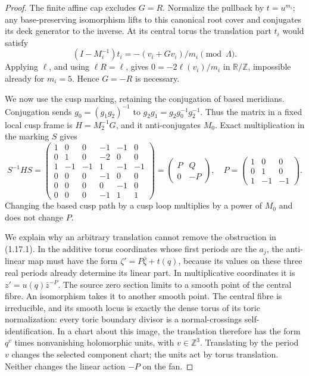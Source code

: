 \begin{proof}
The finite affine cap excludes $G=R$.  Normalize the pullback by
$t=u^{m_i}$; any base-preserving isomorphism lifts to this canonical
root cover and conjugates its deck generator to the inverse.
At its central torus the translation part $t_i$ would satisfy
\[
(I-M_i^{-1})t_i=-(v_i+Gv_i)/m_i\pmod\Lambda.
\]
Applying $\ell$, and using $\ell R=\ell$, gives
$0=-2\ell(v_i)/m_i$ in $\mathbb R/\mathbb Z$, impossible already
for $m_i=5$.  Hence $G=-R$ is necessary.

We now use the cusp marking, retaining the conjugation of based
meridians.  Conjugation sends
$g_0=(g_1g_2)^{-1}$ to $g_2g_1=g_2g_0^{-1}g_2^{-1}$.
Thus the matrix in a fixed local cusp frame is
$H=M_2^{-1}G$, and it anti-conjugates $M_0$.
Exact multiplication in the marking $S$ gives
\[
S^{-1}HS=
\begin{pmatrix}
1&0&0&-1&-1&0\\
0&1&0&-2&0&0\\
1&-1&-1&1&-1&-1\\
0&0&0&-1&0&0\\
0&0&0&0&-1&0\\
0&0&0&-1&1&1
\end{pmatrix}
=\begin{pmatrix}P&Q\\0&-P\end{pmatrix},\quad
P=\begin{pmatrix}1&0&0\\0&1&0\\1&-1&-1\end{pmatrix}.
\tag{1.17.1}
\]
Changing the based cusp path by a cusp loop multiplies by a power of
$M_0$ and does not change $P$.

We explain why an arbitrary translation cannot remove the obstruction
in (1.17.1).  In the additive torus coordinates whose first periods
are the $a_j$, the anti-linear map must have the form
$\zeta' =P\bar\zeta+t(q)$, because its values on these three real
periods already determine its linear part.  In multiplicative
coordinates it is
$z'=u(q)\bar z^{-P}$.
The source zero section limits to a smooth point of the central fibre.
An isomorphism takes it to another smooth point.  The central fibre
is irreducible, and its smooth locus is exactly the dense torus of
its toric normalization: every toric boundary divisor is a
normal-crossings self-identification.  In a chart about this image,
the translation therefore has the form $q^v$ times nonvanishing
holomorphic units, with $v\in\mathbb Z^3$.  Translating by the period
$v$ changes the selected component chart; the units act by torus
translation.  Neither changes the linear action $-P$ on the fan.


\end{proof}
